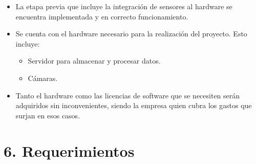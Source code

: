 \documentclass[
11pt, %
]{charter}
\begin{document}
\begin{itemize}
	\item La etapa previa que incluye la integración de sensores al hardware se encuentra implementada y en correcto funcionamiento.
	\item Se cuenta con el hardware necesario para la realización del proyecto. Esto incluye:
\begin{itemize}
	\item Servidor para almacenar y procesar datos.
	\item Cámaras.
\end{itemize}
	\item Tanto el hardware como las licencias de software que se necesiten serán adquiridos sin inconvenientes, siendo la empresa quien cubra los gastos que surjan en esos casos.
	
\end{itemize}

\section{6. Requerimientos}
\label{sec:requerimientos}
\end{document}
